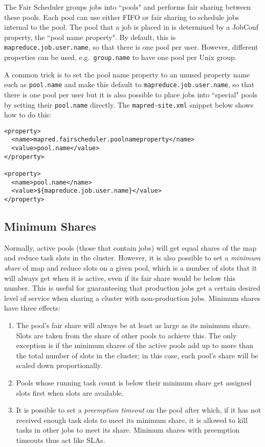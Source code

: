 \documentclass[11pt]{article}
\begin{document}
The Fair Scheduler groups jobs into ``pools" and performs fair sharing between these pools. Each pool can use either FIFO or fair sharing to schedule jobs internal to the pool. The pool that a job is placed in is determined by a JobConf property, the ``pool name property". By default, this is {\tt mapreduce.job.user.name}, so that there is one pool per user. However, different properties can be used, e.g.~{\tt group.name} to have one pool per Unix group.

A common trick is to set the pool name property to an unused property name such as {\tt pool.name} and make this default to {\tt mapreduce.job.user.name}, so that there is one pool per user but it is also possible to place jobs into ``special" pools by setting their {\tt pool.name} directly. The {\tt mapred-site.xml} snippet below shows how to do this:

\begin{verbatim}
<property>
  <name>mapred.fairscheduler.poolnameproperty</name>
  <value>pool.name</value>
</property>

<property>
  <name>pool.name</name>
  <value>${mapreduce.job.user.name}</value>
</property>
\end{verbatim}

\subsection{Minimum Shares}

Normally, active pools (those that contain jobs) will get equal shares of the map and reduce task slots in the cluster. However, it is also possible to set a \emph{minimum share} of map and reduce slots on a given pool, which is a number of slots that it will always get when it is active, even if its fair share would be below this number. This is useful for guaranteeing that production jobs get a certain desired level of service when sharing a cluster with non-production jobs. Minimum shares have three effects:
\begin{enumerate}
  \item The pool's fair share will always be at least as large as its minimum share. Slots are taken from the share of other pools to achieve this. The only exception is if the minimum shares of the active pools add up to more than the total number of slots in the cluster; in this case, each pool's share will be scaled down proportionally.
  \item Pools whose running task count is below their minimum share get assigned slots first when slots are available.
  \item It is possible to set a \emph{preemption timeout} on the pool after which, if it has not received enough task slots to meet its minimum share, it is allowed to kill tasks in other jobs to meet its share. Minimum shares with preemption timeouts thus act like SLAs.
\end{enumerate}
\end{document}
